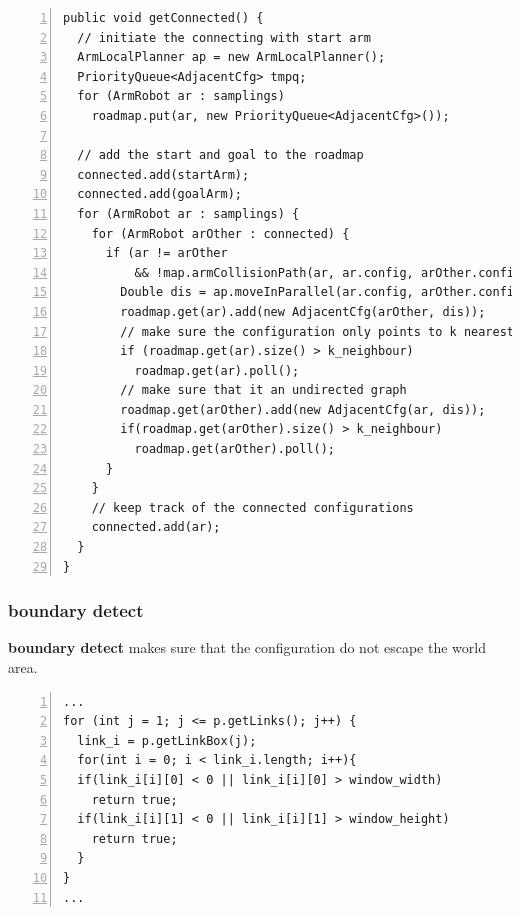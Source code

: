 \documentclass{article}
\begin{document}
\begin{lstlisting}[numbers=left]
public void getConnected() {
  // initiate the connecting with start arm
  ArmLocalPlanner ap = new ArmLocalPlanner();
  PriorityQueue<AdjacentCfg> tmpq;
  for (ArmRobot ar : samplings)
    roadmap.put(ar, new PriorityQueue<AdjacentCfg>());

  // add the start and goal to the roadmap
  connected.add(startArm);
  connected.add(goalArm);
  for (ArmRobot ar : samplings) {
    for (ArmRobot arOther : connected) {
      if (ar != arOther
          && !map.armCollisionPath(ar, ar.config, arOther.config)) {
        Double dis = ap.moveInParallel(ar.config, arOther.config);
        roadmap.get(ar).add(new AdjacentCfg(arOther, dis));
        // make sure the configuration only points to k nearest neighbour
        if (roadmap.get(ar).size() > k_neighbour)
          roadmap.get(ar).poll();
        // make sure that it an undirected graph
        roadmap.get(arOther).add(new AdjacentCfg(ar, dis));
        if(roadmap.get(arOther).size() > k_neighbour)
          roadmap.get(arOther).poll();
      }
    }
    // keep track of the connected configurations
    connected.add(ar);
  }
}
\end{lstlisting}




\subsubsection{boundary detect}
\textbf{boundary detect} makes sure that the configuration do not escape the world area.

\begin{lstlisting}[numbers=left]
...
for (int j = 1; j <= p.getLinks(); j++) {
  link_i = p.getLinkBox(j);
  for(int i = 0; i < link_i.length; i++){
  if(link_i[i][0] < 0 || link_i[i][0] > window_width)
    return true;
  if(link_i[i][1] < 0 || link_i[i][1] > window_height)
    return true;
  }
}
...
\end{lstlisting}
\end{document}
